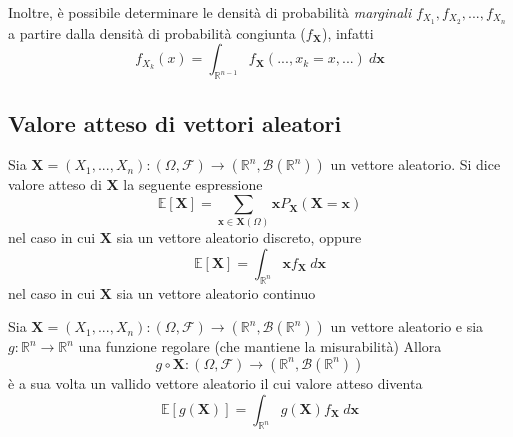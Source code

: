             Inoltre, è possibile determinare le densità di probabilità \textit{marginali} $f_{X_{1}}, f_{X_{2}}, ..., f_{X_{n}}$ a partire dalla densità di probabilità congiunta ($f_{\mathbf{X}}$), infatti
            \[
                f_{X_{k}}(x) = \int_{\mathbb{R}^{n - 1}} f_{\mathbf{X}}(..., x_{k} = x, ...) \: d\mathbf{x}
            \]

        \subsection{Valore atteso di vettori aleatori}
            Sia $\mathbf{X} = (X_{1}, ..., X_{n}): (\Omega, \mathcal{F}) \rightarrow (\mathbb{R}^{n}, \mathcal{B}(\mathbb{R}^{n}))$ un vettore aleatorio.
            Si dice valore atteso di $\mathbf{X}$ la seguente espressione
            \[
                \mathbb{E}[\mathbf{X}] = \sum_{\mathbf{x} \in \mathbf{X}(\Omega)} \mathbf{x} P_{\mathbf{X}}(\mathbf{X} = \mathbf{x})
            \]
            nel caso in cui $\mathbf{X}$ sia un vettore aleatorio discreto, oppure
            \[
                \mathbb{E}[\mathbf{X}] = \int_{\mathbb{R}^{n}} \mathbf{x} f_{\mathbf{X}} \: d\mathbf{x}
            \]
            nel caso in cui $\mathbf{X}$ sia un vettore aleatorio continuo


            Sia $\mathbf{X} = (X_{1}, ..., X_{n}): (\Omega, \mathcal{F}) \rightarrow (\mathbb{R}^{n}, \mathcal{B}(\mathbb{R}^{n}))$ un vettore aleatorio e sia $g: \mathbb{R}^{n} \rightarrow \mathbb{R}^{n}$ una funzione regolare (che mantiene la misurabilità)
            Allora
            \[
                g \circ \mathbf{X} : (\Omega, \mathcal{F}) \rightarrow (\mathbb{R}^{n}, \mathcal{B}(\mathbb{R}^{n}))
            \]
            è a sua volta un vallido vettore aleatorio il cui valore atteso diventa
            \[
                \mathbb{E}[g(\mathbf{X})] = \int_{\mathbb{R}^{n}} g(\mathbf{X}) f_{\mathbf{X}} \: d\mathbf{x}
            \]
